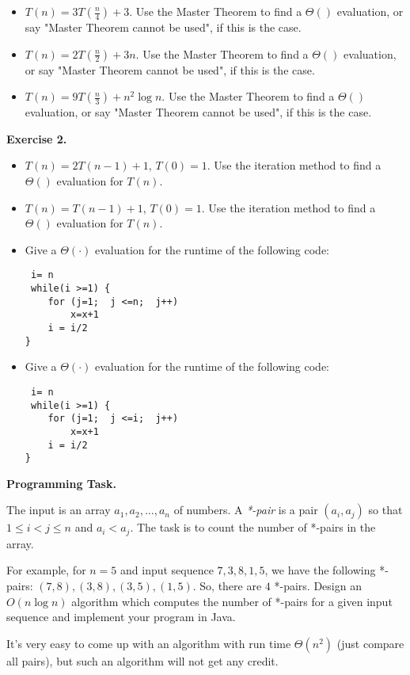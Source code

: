 \documentclass[11pt]{article}
\begin{document}
\begin{itemize}
\item  $T(n) = 3 T(\frac{n}{4}) + 3$. Use the Master Theorem to find a $\Theta()$ evaluation, or say "Master Theorem cannot be used", if this is the case.
\item  $T(n) = 2 T(\frac{n}{2}) + 3n$. Use the Master Theorem to find a $\Theta()$ evaluation, or say "Master Theorem cannot be used", if this is the case.
\item  $T(n) = 9 T(\frac{n}{3}) + n^2 \log n $. Use the Master Theorem to find a $\Theta()$ evaluation, or say "Master Theorem cannot be used", if this is the case.

\end{itemize}
\bigskip

\textbf{Exercise 2.}
\begin{itemize}
\item $T(n) = 2T(n-1) + 1$, $T(0)=1$.  Use the iteration method to find a $\Theta()$ evaluation for $T(n)$.
\item $T(n) = T(n-1) + 1$,  $T(0)=1$.  Use the iteration method to find a $\Theta()$ evaluation for $T(n)$.
\item Give a  $\Theta( \cdot)$ evaluation for the runtime of the following code:
\begin{verbatim}
 i= n
 while(i >=1) {
    for (j=1;  j <=n;  j++)
        x=x+1
    i = i/2
}    
\end{verbatim}
\item Give a  $\Theta( \cdot)$ evaluation for the runtime of the following code:
\begin{verbatim}
 i= n
 while(i >=1) {
    for (j=1;  j <=i;  j++)
        x=x+1
    i = i/2
}
\end{verbatim}
\end{itemize}
\newpage
\textbf{Programming Task.}

The input is an array $a_1, a_2, \ldots, a_n$ of numbers.  A  \emph{*-pair} is a pair $(a_i, a_j)$  so that $1 \le i < j \le n$ and $a_i < a_j$. The task is to count the number of *-pairs
in the array.

For example, for $n = 5$ and input sequence $7, 3, 8, 1, 5$, we have the following *-pairs: $(7,8),  (3, 8),  (3, 5),  (1,5)$.  So, there are $4$ *-pairs. 
Design an $O(n \log n)$ algorithm which computes the number of *-pairs for a
given input sequence and implement your program in Java.

It's very easy to come up with an algorithm with run time  $\Theta(n^2)$ (just compare all pairs), but such an algorithm will not get any credit.
\end{document}
